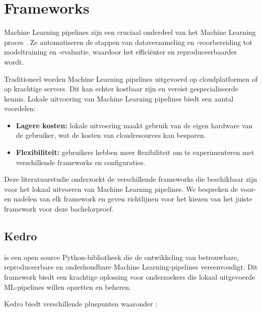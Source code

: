\section{Frameworks}

Machine Learning pipelines zijn een cruciaal onderdeel van het Machine Learning proces \autocite{Jordan2015}. Ze automatiseren de stappen van dataverzameling en -voorbereiding tot modeltraining en -evaluatie, waardoor het efficiënter en reproduceerbaarder wordt.

Traditioneel worden Machine Learning pipelines uitgevoerd op cloudplatformen of op krachtige servers. Dit kan echter kostbaar zijn en vereist gespecialiseerde kennis. Lokale uitvoering van Machine Learning pipelines biedt een aantal voordelen:

\begin{itemize}
  \item \textbf{Lagere kosten:} lokale uitvoering maakt gebruik van de eigen hardware van de gebruiker, wat de kosten van cloudresources kan besparen.
  \item \textbf{Flexibiliteit:} gebruikers hebben meer flexibiliteit om te experimenteren met verschillende frameworks en configuraties.
\end{itemize}

Deze literatuurstudie onderzoekt de verschillende frameworks die beschikbaar zijn voor het lokaal uitvoeren van Machine Learning pipelines. We bespreken de voor- en nadelen van elk framework en geven richtlijnen voor het kiezen van het juiste framework voor deze bachelorproef.
\subsection{Kedro}

\textcite{Kedro2024} is een open source Python-bibliotheek die de ontwikkeling van betrouwbare, reproduceerbare en onderhoudbare Machine Learning-pipelines vereenvoudigt. Dit framework biedt een krachtige oplossing voor onderzoekers die lokaal uitgevoerde ML-pipelines willen opzetten en beheren.

Kedro biedt verschillende pluspunten waaronder \autocite{Kedro2024}:

